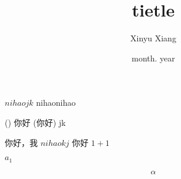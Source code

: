 \documentclass[14pt]{extarticle}
\title{\textbf{tietle}}
\author{Xinyu Xiang}
\date{month. year}
\begin{document}
\maketitle

$nihaojk$ nihaonihao

() 你好 (你好)
jk


你好，我
$nihaokj$
你好
$1+1$

$a_1$


\begin{equation*}
	\alpha
\end{equation*}
\end{document}
